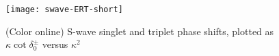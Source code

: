 \documentclass[preprint,showpacs,preprintnumbers,amsmath,amssymb]{revtex4}
\newcommand{\beq}{\begin{equation}}
\newcommand{\eeq}{\end{equation}}
\begin{document}
%


\begin{figure}[H]
	\centering
	\texttt{[image: swave-ERT-short]}
	\caption{(Color online) S-wave singlet and triplet phase shifts, plotted as $\kappa \cot \delta_0^\pm$ versus $\kappa^2$}
	\label{fig:swave-ERT-short}
\end{figure}
\end{document}
